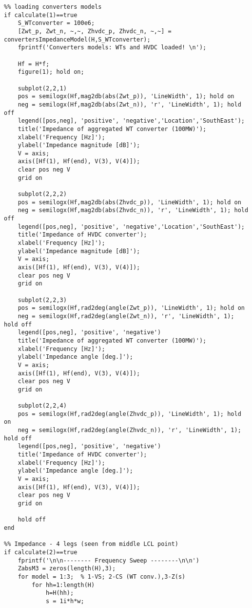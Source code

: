 \begin{appendices}
\begin{lstlisting}
%% loading converters models
if calculate(1)==true
    S_WTconverter = 100e6;
    [Zwt_p, Zwt_n, ~,~, Zhvdc_p, Zhvdc_n, ~,~] = convertersImpedanceModel(H,S_WTconverter);
    fprintf('Converters models: WTs and HVDC loaded! \n');

    Hf = H*f;
    figure(1); hold on;
    
    subplot(2,2,1)
    pos = semilogx(Hf,mag2db(abs(Zwt_p)), 'LineWidth', 1); hold on
    neg = semilogx(Hf,mag2db(abs(Zwt_n)), 'r', 'LineWidth', 1); hold off
    legend([pos,neg], 'positive', 'negative','Location','SouthEast');
    title('Impedance of aggregated WT converter (100MW)');
    xlabel('Frequency [Hz]');
    ylabel('Impedance magnitude [dB]');
    V = axis;
    axis([Hf(1), Hf(end), V(3), V(4)]);
    clear pos neg V
    grid on
    
    subplot(2,2,2)
    pos = semilogx(Hf,mag2db(abs(Zhvdc_p)), 'LineWidth', 1); hold on
    neg = semilogx(Hf,mag2db(abs(Zhvdc_n)), 'r', 'LineWidth', 1); hold off
    legend([pos,neg], 'positive', 'negative','Location','SouthEast');
    title('Impedance of HVDC converter');
    xlabel('Frequency [Hz]');
    ylabel('Impedance magnitude [dB]');
    V = axis;
    axis([Hf(1), Hf(end), V(3), V(4)]);
    clear pos neg V
    grid on
    
    subplot(2,2,3)
    pos = semilogx(Hf,rad2deg(angle(Zwt_p)), 'LineWidth', 1); hold on
    neg = semilogx(Hf,rad2deg(angle(Zwt_n)), 'r', 'LineWidth', 1); hold off
    legend([pos,neg], 'positive', 'negative')
    title('Impedance of aggregated WT converter (100MW)');
    xlabel('Frequency [Hz]');
    ylabel('Impedance angle [deg.]');
    V = axis;
    axis([Hf(1), Hf(end), V(3), V(4)]);
    clear pos neg V
    grid on
    
    subplot(2,2,4)
    pos = semilogx(Hf,rad2deg(angle(Zhvdc_p)), 'LineWidth', 1); hold on
    neg = semilogx(Hf,rad2deg(angle(Zhvdc_n)), 'r', 'LineWidth', 1); hold off
    legend([pos,neg], 'positive', 'negative')
    title('Impedance of HVDC converter');
    xlabel('Frequency [Hz]');
    ylabel('Impedance angle [deg.]');
    V = axis;
    axis([Hf(1), Hf(end), V(3), V(4)]);
    clear pos neg V
    grid on
    
    hold off
end

%% Impedance - 4 legs (seen from middle LCL point)
if calculate(2)==true
    fprintf('\n\n-------- Frequency Sweep --------\n\n')
    ZabsM3 = zeros(length(H),3);
    for model = 1:3;  % 1-VS; 2-CS (WT conv.),3-Z(s)
        for hh=1:length(H)
            h=H(hh);
            s = 1i*h*w;
            

\end{lstlisting}
\end{appendices}
